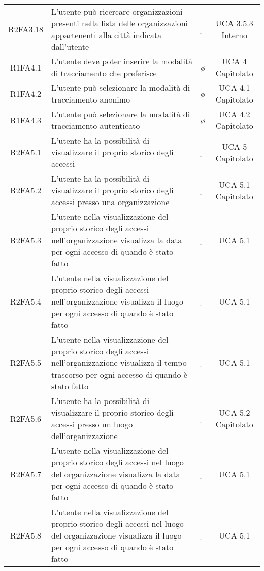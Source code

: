 {\begin{longtable}{ c C{4cm} c c}
R2FA3.18 & L’utente può ricercare organizzazioni presenti nella lista delle organizzazioni appartenenti alla città indicata dall’utente & \d & UCA 3.5.3 Interno \\

R1FA4.1 & L’utente deve poter inserire la modalità di tracciamento che preferisce & \o & UCA 4 Capitolato \\

R1FA4.2 & L’utente può selezionare la modalità di tracciamento anonimo & \o & UCA 4.1 Capitolato \\

R1FA4.3 & L’utente può selezionare la modalità di tracciamento autenticato & \o & UCA 4.2 Capitolato \\

R2FA5.1 & L’utente ha la possibilità di visualizzare il proprio storico degli accessi & \d & UCA 5 Capitolato \\

R2FA5.2 & L’utente ha la possibilità di visualizzare il proprio storico degli accessi presso una organizzazione  & \d & UCA 5.1 Capitolato \\

R2FA5.3 & L'utente nella visualizzazione del proprio storico degli accessi nell'organizzazione visualizza la data per ogni accesso di quando è stato fatto & \d &  UCA 5.1 \\

R2FA5.4 & L'utente nella visualizzazione del proprio storico degli accessi nell'organizzazione visualizza il luogo per ogni accesso di quando è stato fatto & \d &  UCA 5.1 \\

R2FA5.5 & L'utente nella visualizzazione del proprio storico degli accessi nell'organizzazione visualizza il tempo trascorso per ogni accesso di quando è stato fatto & \d &  UCA 5.1 \\

R2FA5.6 & L’utente ha la possibilità di visualizzare il proprio storico degli accessi presso un luogo dell’organizzazione & \d & UCA 5.2 Capitolato\\

R2FA5.7 & L'utente nella visualizzazione del proprio storico degli accessi nel luogo del organizzazione visualizza la data per ogni accesso di quando è stato fatto & \d &  UCA 5.1 \\

R2FA5.8 & L'utente nella visualizzazione del proprio storico degli accessi nel luogo del organizzazione visualizza il luogo per ogni accesso di quando è stato fatto & \d &  UCA 5.1 \\


\end{longtable}}
